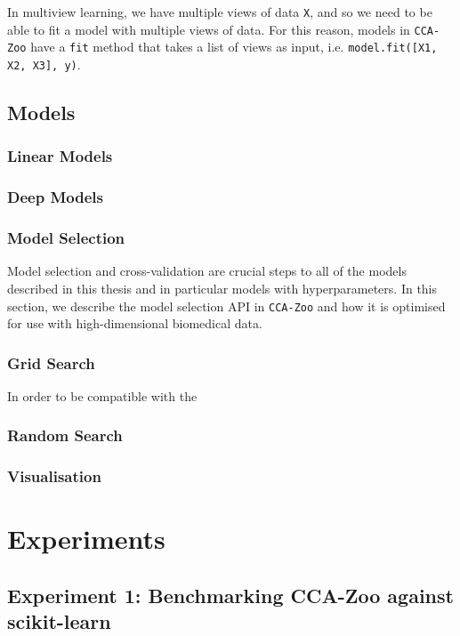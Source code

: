 In multiview learning, we have multiple views of data \texttt{X}, and so we need to be able to fit a model with multiple views of data.
For this reason, models in \texttt{CCA-Zoo} have a \texttt{fit} method that takes a list of views as input, i.e. \texttt{model.fit([X1, X2, X3], y)}.

\subsection{Models}

\subsubsection{Linear Models}

\subsubsection{Deep Models}


\subsubsection{Model Selection}

Model selection and cross-validation are crucial steps to all of the models described in this thesis and in particular models with hyperparameters.
In this section, we describe the model selection API in \texttt{CCA-Zoo} and how it is optimised for use with high-dimensional biomedical data.

\subsubsection{Grid Search}

In order to be compatible with the

\subsubsection{Random Search}

\subsubsection{Visualisation}


\section{Experiments}
\subsection{Experiment 1: Benchmarking CCA-Zoo against scikit-learn}

